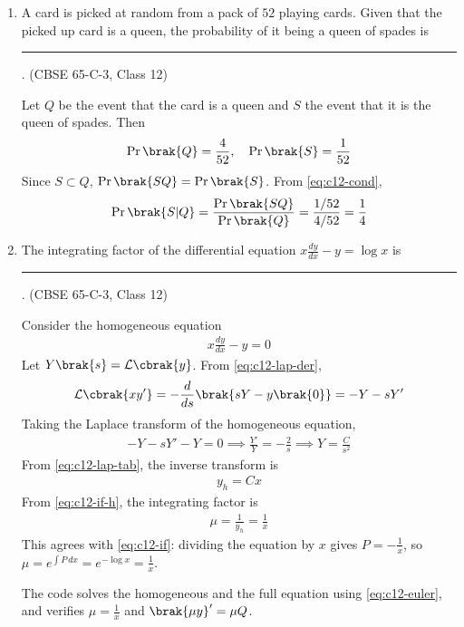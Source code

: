\begin{enumerate}[label=\thesubsection.\arabic*., ref=\thesubsection.\theenumi]
\item A card is picked at random from a pack of $52$ playing cards. Given that the picked up card is a queen, the probability of it being a queen of spades is \rule{1cm}{0.2pt}.
\hfill (CBSE 65-C-3, Class 12)
 
\solution Let $Q$ be the event that the card is a queen and $S$ the event that it is the queen of spades. Then
\begin{align}
\Pr\brak{Q}=\frac{4}{52},\quad \Pr\brak{S}=\frac{1}{52}
\end{align}
Since $S\subset Q$, $\Pr\brak{SQ}=\Pr\brak{S}$. From \eqref{eq:c12-cond},
\begin{align}
\Pr\brak{S|Q} = \frac{\Pr\brak{SQ}}{\Pr\brak{Q}} = \frac{1/52}{4/52} = \frac{1}{4}
\end{align}
 
\begin{center}
\end{center}
 
\item The integrating factor of the differential equation $x\frac{dy}{dx}-y=\log x$ is \rule{1cm}{0.2pt}.
\hfill (CBSE 65-C-3, Class 12)
 
\solution Consider the homogeneous equation
\begin{align}
x\frac{dy}{dx}-y = 0
\end{align}
Let $Y\brak{s}=\mathcal{L}\cbrak{y}$. From \eqref{eq:c12-lap-der},
\begin{align}
\mathcal{L}\cbrak{xy'} = -\frac{d}{ds}\brak{sY-y\brak{0}} = -Y-sY'
\end{align}
Taking the Laplace transform of the homogeneous equation,
\begin{align}
-Y-sY'-Y = 0 \implies \frac{Y'}{Y} = -\frac{2}{s}
\implies Y = \frac{C}{s^2}
\end{align}
From \eqref{eq:c12-lap-tab}, the inverse transform is
\begin{align}
y_h = Cx
\end{align}
From \eqref{eq:c12-if-h}, the integrating factor is
\begin{align}
\mu = \frac{1}{y_h} = \frac{1}{x}
\end{align}
This agrees with \eqref{eq:c12-if}: dividing the equation by $x$ gives $P=-\frac{1}{x}$, so
$\mu = e^{\int P\,dx} = e^{-\log x} = \frac{1}{x}$.
 
The code solves the homogeneous and the full equation using \eqref{eq:c12-euler}, and verifies
$\mu=\frac{1}{x}$ and $\brak{\mu y}'=\mu Q$.
 

\end{enumerate}
